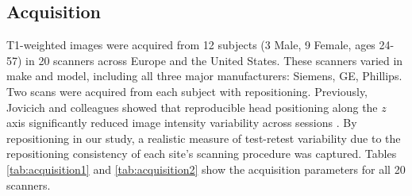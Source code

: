 \subsection{Acquisition}
T1-weighted images were acquired from 12 subjects (3 Male, 9 Female, ages 24-57) in 20 scanners across Europe and the United States. These scanners varied in make and model, including all three major manufacturers: Siemens, GE, Phillips. Two scans were acquired from each subject with repositioning. Previously, Jovicich and colleagues showed that reproducible head positioning along the $z$ axis significantly reduced image intensity variability across sessions \cite{freesurferReliability}. By repositioning in our study, a realistic measure of test-retest variability due to the repositioning consistency of each site's scanning procedure was captured. Tables \ref{tab:acquisition1} and \ref{tab:acquisition2} show the acquisition parameters for all 20 scanners.
